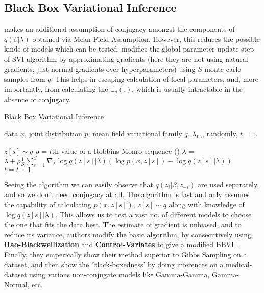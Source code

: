 \documentclass{article} %
\begin{document}
        
       
    \subsection{Black Box Variational Inference}
        \cite{svi} makes an additional assumption of conjugacy amongst the components of $q(\beta|\lambda)$ obtained via Mean Field Assumption. However, this reduces the possible kinds of models which can be tested. \cite{blackboxVI} modifies the global parameter update step of SVI algorithm by approximating gradients (here they are not using natural gradients, just normal gradients over hyperparameters) using $S$ monte-carlo samples from $q$. This helps in escaping calculation of local parameters, and, more importantly, from calculating the $\mathbb{E}_q(.)$, which is usually intractable in the absence of conjugacy.

            \begin{algorithm}
               \caption{Black Box Variational Inference}
               \label{alg:basic}
            \begin{algorithmic}
              data $x$, joint distribution $p$, mean field variational family $q$.
              $\lambda_{1:n}$ randomly, $t = 1$.
              \REPEAT
            
                 \STATE $z[s]\sim q$
               \ENDFOR
               \STATE $\rho$ = $t$th value of a Robbins Monro sequence ()
               \STATE $\lambda$ = $\lambda + \rho \frac{1}{S} \sum_{s=1}^S \nabla_{\lambda} \log q(z[s] | \lambda) (\log p(x, z[s]) - \log q(z[s] | \lambda))$
               \STATE $t = t+1$ 
            \end{algorithmic}
          \end{algorithm}
    
        Seeing the algorithm we can easily observe that $q(z_i|\beta,z_{-i})$ are used separately, and so we don't need conjugacy at all. The algorithm is fast and only assumes the capability of calculating $p(x,z[s])$, $z[s]\sim q$ along with knowledge of $\log q(z[s] | \lambda)$. This allows us to test a vast no. of different models to choose the one that fits the data best. The estimate of gradient is unbiased, and to reduce its variance, authors modify the basic algorithm, by consecutively using \textbf{Rao-Blackwellization} and \textbf{Control-Variates} to give a modified BBVI \cite{blackboxVI}. Finally, they emperically show their method superior to Gibbs Sampling on a dataset, and then show the 'black-boxedness' by doing inferences on a medical-dataset using various non-conjugate models like Gamma-Gamma, Gamma-Normal, etc. 
       
\end{document}
